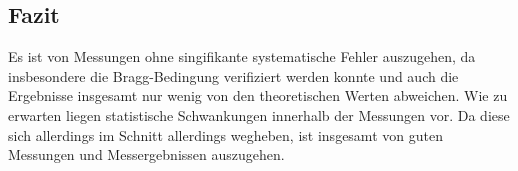 \subsection{Fazit}
Es ist von Messungen ohne singifikante systematische Fehler auszugehen, da insbesondere die Bragg-Bedingung verifiziert werden konnte
und auch die Ergebnisse insgesamt nur wenig von den theoretischen Werten abweichen.
Wie zu erwarten liegen statistische Schwankungen innerhalb der Messungen vor.
Da diese sich allerdings im Schnitt allerdings wegheben, ist insgesamt von guten Messungen und Messergebnissen auszugehen.
